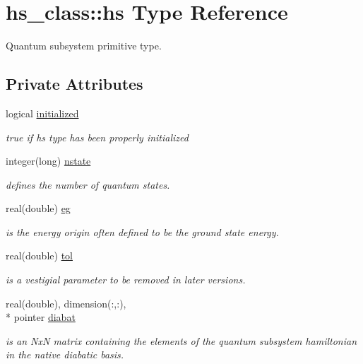 \hypertarget{strucths__class_1_1hs}{\section{hs\-\_\-class\-:\-:hs Type Reference}
\label{strucths__class_1_1hs}
}


Quantum subsystem primitive type.  


\subsection*{Private Attributes}
\begin{DoxyCompactItemize}
\item 
logical \hyperlink{strucths__class_1_1hs_a39ff1ef8fc5a20f97973d4947d518c5f}{initialized}
\begin{DoxyCompactList}\small\item\em true if hs type has been properly initialized \end{DoxyCompactList}\item 
integer(long) \hyperlink{strucths__class_1_1hs_acb57246378a120bd330012dae9a3ff38}{nstate}
\begin{DoxyCompactList}\small\item\em defines the number of quantum states. \end{DoxyCompactList}\item 
real(double) \hyperlink{strucths__class_1_1hs_aa0f4d851a33f1d195d2b6b9334cdb5d5}{eg}
\begin{DoxyCompactList}\small\item\em is the energy origin often defined to be the ground state energy. \end{DoxyCompactList}\item 
real(double) \hyperlink{strucths__class_1_1hs_a45c5cb902e23547a231a25fcd34cc621}{tol}
\begin{DoxyCompactList}\small\item\em is a vestigial parameter to be removed in later versions. \end{DoxyCompactList}\item 
real(double), dimension(\-:,\-:), \\*
pointer \hyperlink{strucths__class_1_1hs_a18f6eb65a6edae047d41c8aa5a3d9d09}{diabat}
\begin{DoxyCompactList}\small\item\em is an Nx\-N matrix containing the elements of the quantum subsystem hamiltonian in the native diabatic basis. \end{DoxyCompactList}\item 

\end{DoxyCompactItemize}

